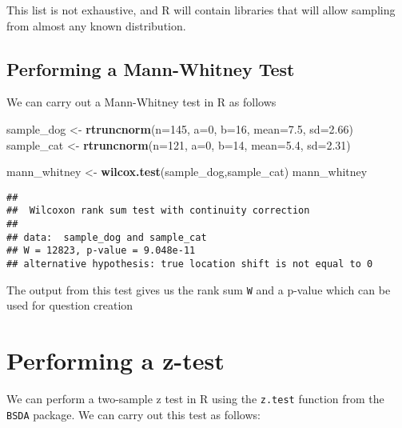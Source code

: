 \documentclass[
]{book}
\newenvironment{Shaded}{\begin{snugshade}}{\end{snugshade}}
\newcommand{\DataTypeTok}[1]{\textcolor[rgb]{0.13,0.29,0.53}{#1}}
\newcommand{\DecValTok}[1]{\textcolor[rgb]{0.00,0.00,0.81}{#1}}
\newcommand{\FloatTok}[1]{\textcolor[rgb]{0.00,0.00,0.81}{#1}}
\newcommand{\KeywordTok}[1]{\textcolor[rgb]{0.13,0.29,0.53}{\textbf{#1}}}
\newcommand{\NormalTok}[1]{#1}
\newcommand{\StringTok}[1]{\textcolor[rgb]{0.31,0.60,0.02}{#1}}
\begin{document}
This list is not exhaustive, and R will contain libraries that will allow sampling from almost any known distribution.

\hypertarget{performing-a-mann-whitney-test}{%
\subsection{Performing a Mann-Whitney Test}\label{performing-a-mann-whitney-test}}

We can carry out a Mann-Whitney test in R as follows

\begin{Shaded}
\begin{Highlighting}[]
\NormalTok{sample_dog <-}\StringTok{ }\KeywordTok{rtruncnorm}\NormalTok{(}\DataTypeTok{n=}\DecValTok{145}\NormalTok{, }\DataTypeTok{a=}\DecValTok{0}\NormalTok{, }\DataTypeTok{b=}\DecValTok{16}\NormalTok{, }\DataTypeTok{mean=}\FloatTok{7.5}\NormalTok{, }\DataTypeTok{sd=}\FloatTok{2.66}\NormalTok{)}
\NormalTok{sample_cat <-}\StringTok{ }\KeywordTok{rtruncnorm}\NormalTok{(}\DataTypeTok{n=}\DecValTok{121}\NormalTok{, }\DataTypeTok{a=}\DecValTok{0}\NormalTok{, }\DataTypeTok{b=}\DecValTok{14}\NormalTok{, }\DataTypeTok{mean=}\FloatTok{5.4}\NormalTok{, }\DataTypeTok{sd=}\FloatTok{2.31}\NormalTok{)}

\NormalTok{mann_whitney <-}\StringTok{ }\KeywordTok{wilcox.test}\NormalTok{(sample_dog,sample_cat)}
\NormalTok{mann_whitney}
\end{Highlighting}
\end{Shaded}

\begin{verbatim}
## 
##  Wilcoxon rank sum test with continuity correction
## 
## data:  sample_dog and sample_cat
## W = 12823, p-value = 9.048e-11
## alternative hypothesis: true location shift is not equal to 0
\end{verbatim}

The output from this test gives us the rank sum \texttt{W} and a p-value which can be used for question creation

\hypertarget{performing-a-z-test}{%
\section{Performing a z-test}\label{performing-a-z-test}}

We can perform a two-sample z test in R using the \texttt{z.test} function from the \texttt{BSDA} package. We can carry out this test as follows:
\end{document}
